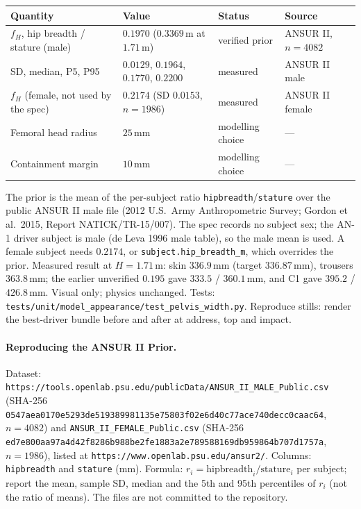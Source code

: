 \begin{table}[h]
\centering
\begin{tabular}{llll}
Quantity & Value & Status & Source \\ \hline
$f_H$, hip breadth / stature (male) & $0.1970$ ($0.3369$\,m at $1.71$\,m) & verified prior & ANSUR II, $n=4082$ \\
\quad SD, median, P5, P95 & $0.0129$, $0.1964$, $0.1770$, $0.2200$ & measured & ANSUR II male \\
$f_H$ (female, not used by the spec) & $0.2174$ (SD $0.0153$, $n=1986$) & measured & ANSUR II female \\
Femoral head radius & $25$\,mm & modelling choice & --- \\
Containment margin & $10$\,mm & modelling choice & --- \\
\end{tabular}
\end{table}
The prior is the mean of the per-subject ratio \texttt{hipbreadth}/\texttt{stature}
over the public ANSUR II male file (2012 U.S.\ Army Anthropometric Survey; Gordon
et al.\ 2015, Report NATICK/TR-15/007). The spec records no subject sex; the
AN-1 driver subject is male (de Leva 1996 male table), so the male mean is used.
A female subject needs $0.2174$, or \texttt{subject.hip\_breadth\_m}, which
overrides the prior. Measured result at $H=1.71$\,m: skin $336.9$\,mm (target
$336.87$\,mm), trousers $363.8$\,mm; the earlier unverified $0.195$ gave
$333.5$ / $360.1$\,mm, and C1 gave $395.2$ / $426.8$\,mm. Visual only; physics
unchanged. Tests: \texttt{tests/unit/model\_appearance/test\_pelvis\_width.py}.
Reproduce stills: render the best-driver bundle before and after at address,
top and impact.

\paragraph{Reproducing the ANSUR II Prior.}
Dataset: \texttt{https://tools.openlab.psu.edu/publicData/ANSUR\_II\_MALE\_Public.csv}
(SHA-256 \texttt{0547aea0170e5293de519389981135e75803f02e6d40c77ace740decc0caac64},
$n=4082$) and \texttt{ANSUR\_II\_FEMALE\_Public.csv} (SHA-256
\texttt{ed7e800aa97a4d42f8286b988be2fe1883a2e789588169db959864b707d1757a},
$n=1986$), listed at \texttt{https://www.openlab.psu.edu/ansur2/}. Columns:
\texttt{hipbreadth} and \texttt{stature} (mm). Formula: $r_i=\mathrm{hipbreadth}_i/\mathrm{stature}_i$
per subject; report the mean, sample SD, median and the 5th and 95th percentiles
of $r_i$ (not the ratio of means). The files are not committed to the repository.

